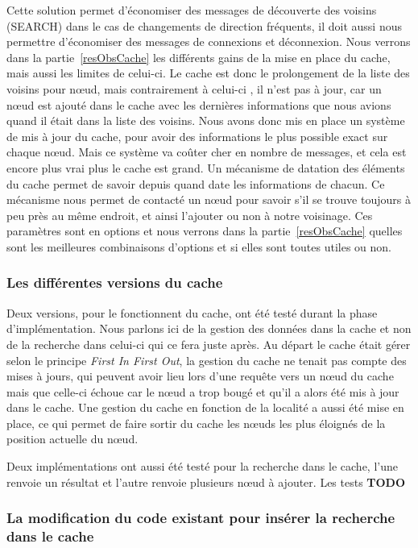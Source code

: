 \par Cette solution permet d'économiser des messages de découverte des voisins (SEARCH) dans le cas de changements de direction fréquents, il doit aussi nous permettre d'économiser des messages de connexions et déconnexion. Nous verrons dans la partie~\ref{resObsCache} les différents gains de la mise en place du cache, mais aussi les limites de celui-ci. Le cache est donc le prolongement de la liste des voisins pour nœud, mais contrairement à celui-ci , il n'est pas à jour, car un nœud est ajouté dans le cache avec les dernières informations que nous avions quand il était dans la liste des voisins. Nous avons donc mis en place un système de mis à jour du cache, pour avoir des informations le plus possible exact sur chaque nœud. Mais ce système va coûter cher en nombre de messages, et cela est encore plus vrai plus le cache est grand. Un mécanisme de datation des éléments du cache permet de savoir depuis quand date les informations de chacun. Ce mécanisme nous permet de contacté un nœud pour savoir s'il se trouve toujours à peu près au même endroit, et ainsi l'ajouter ou non à notre voisinage. Ces paramètres sont en options et nous verrons dans la partie~\ref{resObsCache} quelles sont les meilleures combinaisons d'options et si elles sont toutes utiles ou non.

\subsubsection{Les différentes versions du cache}

Deux versions, pour le fonctionnent du cache, ont été testé durant la phase d'implémentation. Nous parlons ici de la gestion des données dans la cache et non de la recherche dans celui-ci qui ce fera juste après. Au départ le cache était gérer selon le principe \textit{First In First Out}, la gestion du cache ne tenait pas compte des mises à jours, qui peuvent avoir lieu lors d'une requête vers un nœud du cache mais que celle-ci échoue car le nœud a trop bougé et qu'il a alors été mis à jour dans le cache. Une gestion du cache en fonction de la localité a aussi été mise en place, ce qui permet de faire sortir du cache les nœuds les plus éloignés de la position actuelle du nœud.
\par Deux implémentations ont aussi été testé pour la recherche dans le cache, l'une renvoie un résultat et l'autre renvoie plusieurs nœud à ajouter. Les tests \textbf{TODO}


\subsubsection{La modification du code existant pour insérer la recherche dans le cache}

